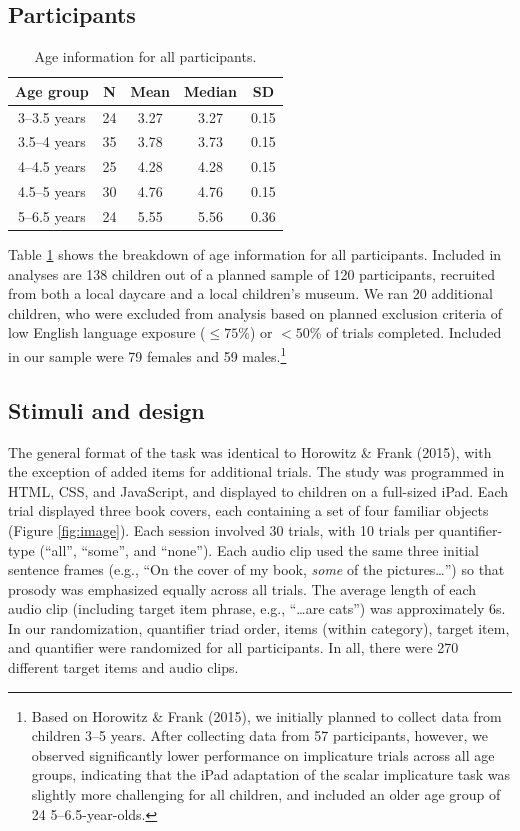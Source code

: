\documentclass[10pt, letterpaper]{article}
\begin{document}
\subsection{Participants}\label{participants}

\begin{table}[t]
\centering
\begin{tabular}{c c c c c } 
 \hline
 Age group & N & Mean & Median & SD \\
 \hline
 3--3.5 years & 24 & 3.27 & 3.27 & 0.15\\
 3.5--4 years & 35 & 3.78 & 3.73 & 0.15 \\ 
 4--4.5 years & 25 & 4.28 & 4.28 & 0.15\\
 4.5--5 years & 30 & 4.76 & 4.76 & 0.15 \\
 5--6.5 years & 24 & 5.55 & 5.56 & 0.36 \\
 \hline
\end{tabular}
\caption{Age information for all participants.}
\label{tab:age}
\end{table}

Table \ref{tab:age} shows the breakdown of age information for all
participants. Included in analyses are 138 children out of a planned
sample of 120 participants, recruited from both a local daycare and a
local children's museum. We ran 20 additional children, who were
excluded from analysis based on planned exclusion criteria of low
English language exposure (\(\leq 75\%\)) or \(<50\%\) of trials
completed. Included in our sample were 79 females and 59
males.\footnote{Based on Horowitz \& Frank (2015), we initially planned
  to collect data from children 3--5 years. After collecting data from
  57 participants, however, we observed significantly lower performance
  on implicature trials across all age groups, indicating that the iPad
  adaptation of the scalar implicature task was slightly more
  challenging for all children, and included an older age group of 24
  5--6.5-year-olds.}

\subsection{Stimuli and design}\label{stimuli-and-design}

The general format of the task was identical to Horowitz \& Frank
(2015), with the exception of added items for additional trials. The
study was programmed in HTML, CSS, and JavaScript, and displayed to
children on a full-sized iPad. Each trial displayed three book covers,
each containing a set of four familiar objects (Figure \ref{fig:image}).
Each session involved 30 trials, with 10 trials per quantifier-type
(``all'', ``some'', and ``none''). Each audio clip used the same three
initial sentence frames (e.g., ``On the cover of my book, \emph{some} of
the pictures\ldots{}'') so that prosody was emphasized equally across
all trials. The average length of each audio clip (including target item
phrase, e.g., ``\ldots{}are cats'') was approximately 6s. In our
randomization, quantifier triad order, items (within category), target
item, and quantifier were randomized for all participants. In all, there
were 270 different target items and audio clips.
\end{document}
